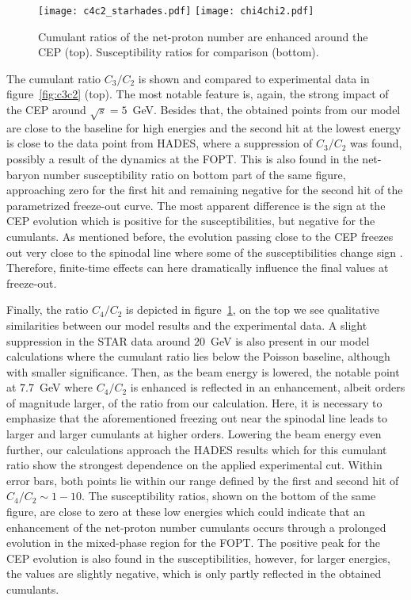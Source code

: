 \documentclass[%
 reprint,
 amsmath,amssymb,
 aps,
]{revtex4-2}
\begin{document}
\begin{figure}[tbp]
\centering
\texttt{[image: c4c2\_starhades.pdf]}
\hfill
\texttt{[image: chi4chi2.pdf]}
\caption{Cumulant ratios of the net-proton number are enhanced around the CEP (top). Susceptibility ratios for comparison (bottom).}
\label{fig:c4c2}
\end{figure}

The cumulant ratio $C_3/C_2$ is shown and compared to experimental data in figure~\ref{fig:c3c2} (top). The most notable feature is, again, the strong impact of the CEP around $\sqrt{s}=5$~GeV. Besides that, the obtained points from our model are close to the baseline for high energies and the second hit at the lowest energy is close to the data point from HADES, where a suppression of $C_3/C_2$ was found, possibly a result of the dynamics at the FOPT. This is also found in the net-baryon number susceptibility ratio on bottom part of the same figure, approaching zero for the first hit and remaining negative for the second hit of the parametrized freeze-out curve. The most apparent difference is the sign at the CEP evolution which is positive for the susceptibilities, but negative for the cumulants. As mentioned before, the evolution passing close to the CEP freezes out very close to the spinodal line where some of the susceptibilities change sign \cite{Herold:2014zoa}. Therefore, finite-time effects can here dramatically influence the final values at freeze-out. 

Finally, the ratio $C_4/C_2$ is depicted in figure~\ref{fig:c4c2}, on the top we see qualitative similarities between our model results and the experimental data. A slight suppression in the STAR data around $20$~GeV is also present in our model calculations where the cumulant ratio lies below the Poisson baseline, although with smaller significance. Then, as the beam energy is lowered, the notable point at $7.7$~GeV where $C_4/C_2$ is enhanced is reflected in an enhancement, albeit orders of magnitude larger, of the ratio from our calculation. Here, it is necessary to emphasize that the aforementioned freezing out near the spinodal line leads to larger and larger cumulants at higher orders. Lowering the beam energy even further, our calculations approach the HADES results which for this cumulant ratio show the strongest dependence on the applied experimental cut. Within error bars, both points lie within our range defined by the first and second hit of $C_4/C_2\sim 1-10$. The susceptibility ratios, shown on the bottom of the same figure, are close to zero at these low energies which could indicate that an enhancement of the net-proton number cumulants occurs through a prolonged evolution in the mixed-phase region for the FOPT. The positive peak for the CEP evolution is also found in the susceptibilities, however, for larger energies, the values are slightly negative, which is only partly reflected in the obtained cumulants. 
\end{document}
